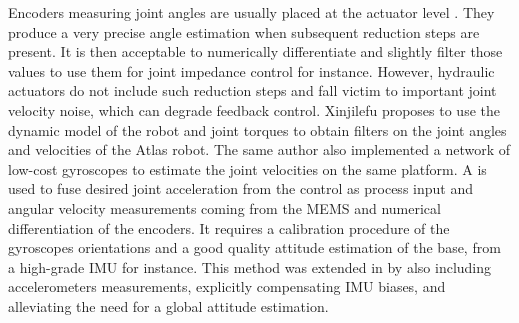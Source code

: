 Encoders measuring joint angles are usually placed at the actuator level \cite{xinjilefu2014decoupled}. 
They produce a very precise angle estimation when subsequent reduction steps are present. It is then acceptable to numerically 
differentiate and slightly filter those values to use them for joint impedance control for instance. However, hydraulic
actuators do not include such reduction steps and fall victim to important joint velocity noise, which can degrade feedback control.
Xinjilefu \cite{xinjilefu2014decoupled} proposes to use the dynamic model of the robot and joint torques to obtain filters on the joint angles and velocities
of the Atlas robot. The same author \cite{xinjilefu2016distributed} also implemented a network of low-cost gyroscopes to estimate the joint velocities 
on the same platform. A \KalmanF is used to fuse desired joint acceleration from the control as process input and angular velocity measurements coming from 
the MEMS and numerical differentiation of the encoders. It requires a calibration procedure of the gyroscopes orientations and a good quality attitude
estimation of the base, from a high-grade IMU for instance. This method was extended in \cite{rotella2016imu} by also including
accelerometers measurements, explicitly compensating IMU biases, and alleviating the need for a global attitude estimation.

